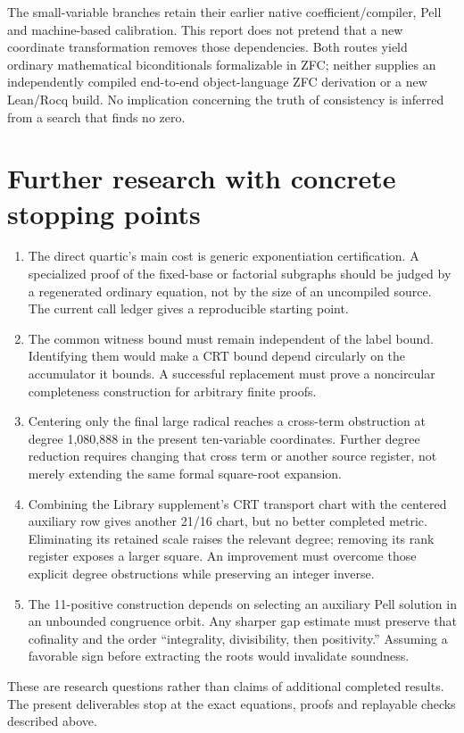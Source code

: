 \documentclass[11pt]{article}
\begin{document}
The small-variable branches retain their earlier native coefficient/compiler,
Pell and machine-based calibration. This report does not pretend that a new
coordinate transformation removes those dependencies. Both routes yield
ordinary mathematical biconditionals formalizable in ZFC; neither supplies
an independently compiled end-to-end object-language ZFC derivation or a new
Lean/Rocq build. No implication concerning the truth of consistency is
inferred from a search that finds no zero.

\section{Further research with concrete stopping points}
\begin{enumerate}
\item The direct quartic's main cost is generic exponentiation certification.
A specialized proof of the fixed-base or factorial subgraphs should be judged
by a regenerated ordinary equation, not by the size of an uncompiled source.
The current call ledger gives a reproducible starting point.
\item The common witness bound must remain independent of the label bound.
Identifying them would make a CRT bound depend circularly on the accumulator
it bounds. A successful replacement must prove a noncircular completeness
construction for arbitrary finite proofs.
\item Centering only the final large radical reaches a cross-term obstruction
at degree 1,080,888 in the present ten-variable coordinates. Further degree
reduction requires changing that cross term or another source register, not
merely extending the same formal square-root expansion.
\item Combining the Library supplement's CRT transport chart with the
centered auxiliary row gives another 21/16 chart, but no better completed
metric. Eliminating its retained scale raises the relevant degree; removing
its rank register exposes a larger square. An improvement must overcome
those explicit degree obstructions while preserving an integer inverse.
\item The 11-positive construction depends on selecting an auxiliary Pell
solution in an unbounded congruence orbit. Any sharper gap estimate must
preserve that cofinality and the order ``integrality, divisibility, then
positivity.'' Assuming a favorable sign before extracting the roots would
invalidate soundness.
\end{enumerate}
These are research questions rather than claims of additional completed
results. The present deliverables stop at the exact equations, proofs and
replayable checks described above.
\end{document}
